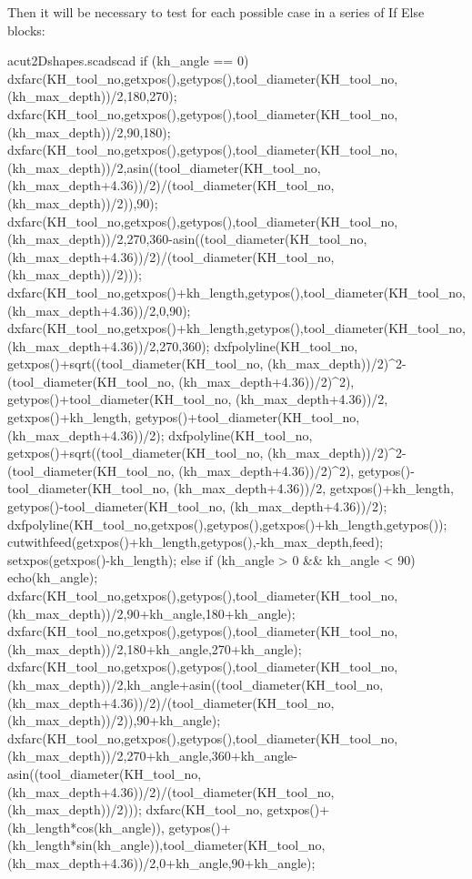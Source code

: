 \documentclass{ltxdoc}
\begin{document}
Then it will be necessary to test for each possible case in a series of If Else blocks:
 
\lstset{firstnumber=\thecuttwod}
\begin{writecode}{a}{cut2Dshapes.scad}{scad}
  if (kh_angle == 0) {
dxfarc(KH_tool_no,getxpos(),getypos(),tool_diameter(KH_tool_no, (kh_max_depth))/2,180,270);
dxfarc(KH_tool_no,getxpos(),getypos(),tool_diameter(KH_tool_no, (kh_max_depth))/2,90,180);
dxfarc(KH_tool_no,getxpos(),getypos(),tool_diameter(KH_tool_no, (kh_max_depth))/2,asin((tool_diameter(KH_tool_no, (kh_max_depth+4.36))/2)/(tool_diameter(KH_tool_no, (kh_max_depth))/2)),90);
dxfarc(KH_tool_no,getxpos(),getypos(),tool_diameter(KH_tool_no, (kh_max_depth))/2,270,360-asin((tool_diameter(KH_tool_no, (kh_max_depth+4.36))/2)/(tool_diameter(KH_tool_no, (kh_max_depth))/2)));
dxfarc(KH_tool_no,getxpos()+kh_length,getypos(),tool_diameter(KH_tool_no, (kh_max_depth+4.36))/2,0,90);
dxfarc(KH_tool_no,getxpos()+kh_length,getypos(),tool_diameter(KH_tool_no, (kh_max_depth+4.36))/2,270,360);
dxfpolyline(KH_tool_no, getxpos()+sqrt((tool_diameter(KH_tool_no, (kh_max_depth))/2)^2-(tool_diameter(KH_tool_no, (kh_max_depth+4.36))/2)^2), getypos()+tool_diameter(KH_tool_no, (kh_max_depth+4.36))/2, getxpos()+kh_length, getypos()+tool_diameter(KH_tool_no, (kh_max_depth+4.36))/2);
dxfpolyline(KH_tool_no, getxpos()+sqrt((tool_diameter(KH_tool_no, (kh_max_depth))/2)^2-(tool_diameter(KH_tool_no, (kh_max_depth+4.36))/2)^2), getypos()-tool_diameter(KH_tool_no, (kh_max_depth+4.36))/2, getxpos()+kh_length, getypos()-tool_diameter(KH_tool_no, (kh_max_depth+4.36))/2);
dxfpolyline(KH_tool_no,getxpos(),getypos(),getxpos()+kh_length,getypos());
cutwithfeed(getxpos()+kh_length,getypos(),-kh_max_depth,feed);
setxpos(getxpos()-kh_length);
  } else if (kh_angle > 0 && kh_angle < 90) {
echo(kh_angle);
  dxfarc(KH_tool_no,getxpos(),getypos(),tool_diameter(KH_tool_no, (kh_max_depth))/2,90+kh_angle,180+kh_angle);
  dxfarc(KH_tool_no,getxpos(),getypos(),tool_diameter(KH_tool_no, (kh_max_depth))/2,180+kh_angle,270+kh_angle);
dxfarc(KH_tool_no,getxpos(),getypos(),tool_diameter(KH_tool_no, (kh_max_depth))/2,kh_angle+asin((tool_diameter(KH_tool_no, (kh_max_depth+4.36))/2)/(tool_diameter(KH_tool_no, (kh_max_depth))/2)),90+kh_angle);
dxfarc(KH_tool_no,getxpos(),getypos(),tool_diameter(KH_tool_no, (kh_max_depth))/2,270+kh_angle,360+kh_angle-asin((tool_diameter(KH_tool_no, (kh_max_depth+4.36))/2)/(tool_diameter(KH_tool_no, (kh_max_depth))/2)));
dxfarc(KH_tool_no,
  getxpos()+(kh_length*cos(kh_angle)),
  getypos()+(kh_length*sin(kh_angle)),tool_diameter(KH_tool_no, (kh_max_depth+4.36))/2,0+kh_angle,90+kh_angle);
}
\end{writecode}
\end{document}
